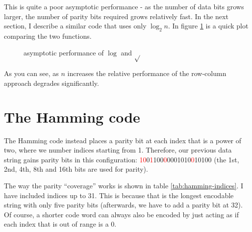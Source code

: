 \documentclass[11pt]{article}
\begin{document}
    This is quite a poor asymptotic performance - as the number of data bits
    grows larger, the number of parity bits required grows relatively fast. In
    the next section, I describe a similar code that uses only $\log_2 n$. In
    figure \ref{fig:logsqrtplot} is a quick plot comparing the two functions.

\begin{figure}[H]
\begin{center}
\end{center}
\caption{asymptotic performance of $\log$ and $\sqrt{}$}\label{fig:logsqrtplot}
\end{figure}

    As you can see, as $n$ increases the relative performance of the row-column
    approach degrades significantly.

    \section{The Hamming code}

    The Hamming code instead places a parity bit at each index that is a power
    of two, where we number indices starting from 1. Therefore, our previous
    data string gains parity bits in this configuration:
    \textcolor{red}{10}0\textcolor{red}{1}100\textcolor{red}{0}0001010\textcolor{red}{0}10100
    (the 1st, 2nd, 4th, 8th and 16th bits are used for parity).

    The way the parity ``coverage'' works is shown in table
    \ref{tab:hamming-indices}.  I have included indices up to 31. This is
    because that is the longest encodable string with only five parity bits
    (afterwards, we have to add a parity bit at 32). Of course, a shorter code
    word can always also be encoded by just acting as if each index that is out
    of range is a 0.
\end{document}
